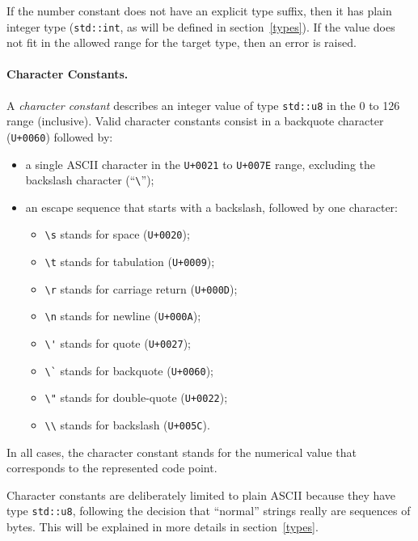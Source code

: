 If the number constant does not have an explicit type suffix, then it
has plain integer type (\verb|std::int|, as will be defined in
section~\ref{types}). If the value does not fit in the allowed range for
the target type, then an error is raised.

\paragraph{Character Constants.} A \emph{character constant} describes
an integer value of type \verb|std::u8| in the 0 to 126 range
(inclusive). Valid character constants consist in a backquote character
(\verb|U+0060|) followed by:
\begin{itemize}

    \item a single ASCII character in the \verb|U+0021| to
    \verb|U+007E| range, excluding the backslash character
    (``\verb|\|'');

    \item an escape sequence that starts with a backslash, followed
    by one character:
    \begin{itemize}

        \item \verb|\s| stands for space (\verb|U+0020|);
        \item \verb|\t| stands for tabulation (\verb|U+0009|);
        \item \verb|\r| stands for carriage return (\verb|U+000D|);
        \item \verb|\n| stands for newline (\verb|U+000A|);
        \item \verb|\'| stands for quote (\verb|U+0027|);
        \item \verb|\`| stands for backquote (\verb|U+0060|);
        \item \verb|\"| stands for double-quote (\verb|U+0022|);
        \item \verb|\\| stands for backslash (\verb|U+005C|).

    \end{itemize}

\end{itemize}

In all cases, the character constant stands for the numerical value that
corresponds to the represented code point.

\begin{rationale}
Character constants are deliberately limited to plain ASCII because
they have type \verb|std::u8|, following the decision that ``normal''
strings really are sequences of bytes. This will be explained in more
details in section~\ref{types}.
\end{rationale}

